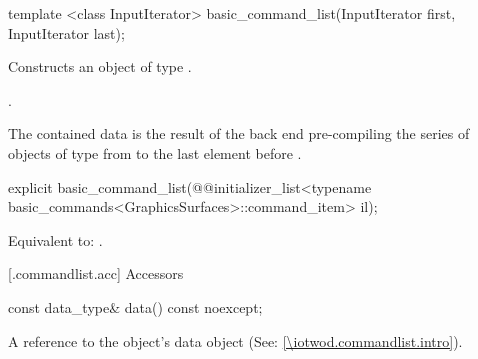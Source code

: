 %
\begin{itemdecl}
template <class InputIterator>
basic_command_list(InputIterator first, InputIterator last);
\end{itemdecl}
\begin{itemdescr}
\pnum
\effects
Constructs an object of type .

\pnum
\postconditions
{}.

\pnum
\begin{note}
The contained data is the result of the back end pre-compiling the series of objects of type  from  to the last element before .
\end{note}
\end{itemdescr}

%
\begin{itemdecl}
explicit basic_command_list(@\stdqualifier{}@initializer_list<typename
  basic_commands<GraphicsSurfaces>::command_item> il);
\end{itemdecl}
\begin{itemdescr}
\pnum
\effects
Equivalent to: .
\end{itemdescr}

 [\iotwod.commandlist.acc] {Accessors}

%
\begin{itemdecl}
const data_type& data() const noexcept;
\end{itemdecl}
\begin{itemdescr}
\pnum
\returns A reference to the  object's data object (See: \ref{\iotwod.commandlist.intro}).
\end{itemdescr}
